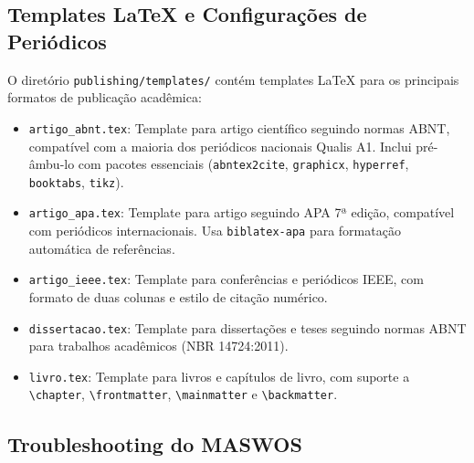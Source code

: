 \subsection{Templates LaTeX e Configurações de Periódicos}
\label{sec:latex-templates}

O diretório \texttt{publishing/templates/} contém templates LaTeX para os principais formatos de publicação acadêmica:

\begin{itemize}
  \item \texttt{artigo\_abnt.tex}: Template para artigo científico seguindo normas ABNT, compatível com a maioria dos periódicos nacionais Qualis A1. Inclui pré-âmbu-lo com pacotes essenciais (\texttt{abntex2cite}, \texttt{graphicx}, \texttt{hyperref}, \texttt{booktabs}, \texttt{tikz}).
  
  \item \texttt{artigo\_apa.tex}: Template para artigo seguindo APA 7ª edição, compatível com periódicos internacionais. Usa \texttt{biblatex-apa} para formatação automática de referências.
  
  \item \texttt{artigo\_ieee.tex}: Template para conferências e periódicos IEEE, com formato de duas colunas e estilo de citação numérico.
  
  \item \texttt{dissertacao.tex}: Template para dissertações e teses seguindo normas ABNT para trabalhos acadêmicos (NBR 14724:2011).
  
  \item \texttt{livro.tex}: Template para livros e capítulos de livro, com suporte a \texttt{\textbackslash chapter}, \texttt{\textbackslash frontmatter}, \texttt{\textbackslash mainmatter} e \texttt{\textbackslash backmatter}.
\end{itemize}

\subsection{Troubleshooting do MASWOS}
\label{sec:maswos-troubleshooting}

